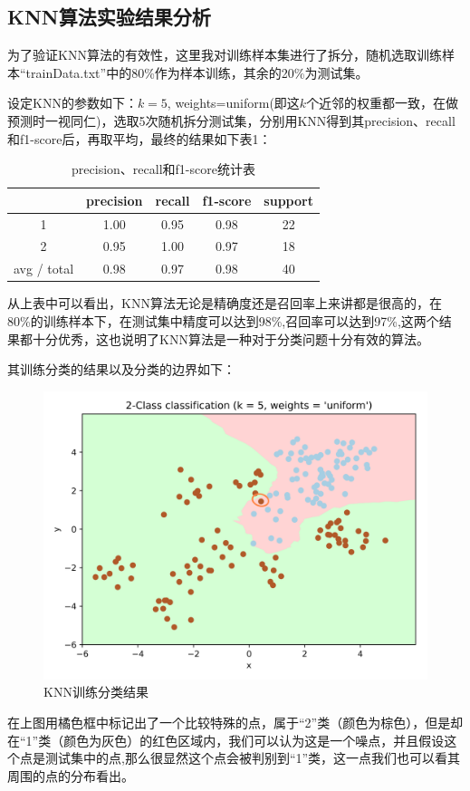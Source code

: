 \documentclass{article}
\newcommand{\hs}{\hspace{2em}}
\begin{document}
\subsection{KNN算法实验结果分析}
{}

\hs 为了验证KNN算法的有效性，这里我对训练样本集进行了拆分，随机选取训练样本“trainData.txt”中的80\%作为样本训练，其余的20\%为测试集。

\hs 设定KNN的参数如下：$k=5$, weights=uniform(即这$k$个近邻的权重都一致，在做预测时一视同仁)，选取5次随机拆分测试集，分别用KNN得到其precision、recall和f1-score后，再取平均，最终的结果如下表1：


\begin{table}[htbp]
	\caption{precision、recall和f1-score统计表}
	\centering
\begin{tabular}{c|cccc}	
	& precision&recall&f1-score & support \\
	\hline
	1    &   1.00  &    0.95  &    0.98  &      22\\
	2    &   0.95    &  1.00   &   0.97    &    18 \\
	avg / total    &   0.98  &    0.97  &    0.98 &       40
\end{tabular}	
\end{table}

\hs 从上表中可以看出，KNN算法无论是精确度还是召回率上来讲都是很高的，在80\%的训练样本下，在测试集中精度可以达到98\%,召回率可以达到97\%,这两个结果都十分优秀，这也说明了KNN算法是一种对于分类问题十分有效的算法。

\hs 其训练分类的结果以及分类的边界如下：

\begin{figure}[htbp]
	\centering
	\includegraphics[width=0.6\linewidth]{img//fig6.png}
	\caption{KNN训练分类结果}
\end{figure}

\hs 在上图用橘色框中标记出了一个比较特殊的点，属于“2”类（颜色为棕色），但是却在“1”类（颜色为灰色）的红色区域内，我们可以认为这是一个噪点，并且假设这个点是测试集中的点,那么很显然这个点会被判别到“1”类，这一点我们也可以看其周围的点的分布看出。
\end{document}
